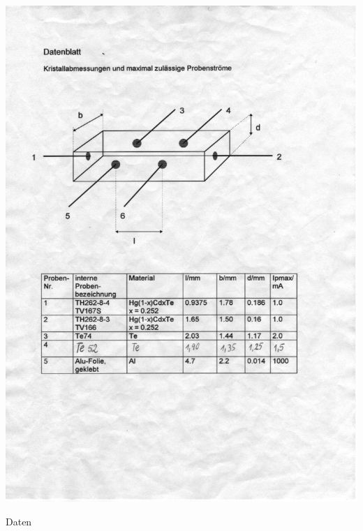 \begin{table}[htb!]
 \centering
 \includegraphics[viewport=55 200 500 390,clip]{../docs/scan_datenblatt}
 \caption{Daten}
 \label{tab:daten}
\end{table}